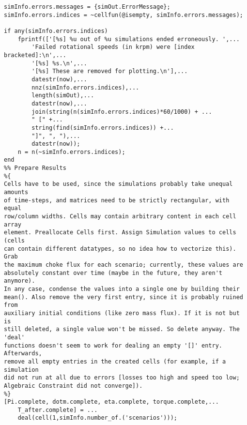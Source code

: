 \begin{lstlisting}
simInfo.errors.messages = {simOut.ErrorMessage};
simInfo.errors.indices = ~cellfun(@isempty, simInfo.errors.messages);

if any(simInfo.errors.indices)
    fprintf(['[%s] %u out of %u simulations ended erroneously. ',...
        'Failed rotational speeds (in krpm) were [index bracketed]:\n',...
        '[%s] %s.\n',...
        '[%s] These are removed for plotting.\n'],...
        datestr(now),...
        nnz(simInfo.errors.indices),...
        length(simOut),...
        datestr(now),...
        join(string(n(simInfo.errors.indices)*60/1000) + ...
        " [" +...
        string(find(simInfo.errors.indices)) +...
        "]", ", "),...
        datestr(now));
    n = n(~simInfo.errors.indices);
end
%% Prepare Results
%{
Cells have to be used, since the simulations probably take unequal amounts
of time-steps, and matrices need to be strictly rectangular, with equal
row/column widths. Cells may contain arbitrary content in each cell array
element. Preallocate Cells first. Assign Simulation values to cells (cells
can contain different datatypes, so no idea how to vectorize this). Grab
the maximum choke flux for each scenario; currently, these values are
absolutely constant over time (maybe in the future, they aren't anymore).
In any case, condense the values into a single one by building their
mean(). Also remove the very first entry, since it is probably ruined from
auxiliary initial conditions (like zero mass flux). If it is not but is
still deleted, a single value won't be missed. So delete anyway. The 'deal'
functions doesn't seem to work for dealing an empty '[]' entry. Afterwards,
remove all empty entries in the created cells (for example, if a simulation
did not run at all due to errors [losses too high and speed too low;
Algebraic Constraint did not converge]).
%}
[Pi.complete, dotm.complete, eta.complete, torque.complete,...
    T_after.complete] = ...
    deal(cell(1,simInfo.number_of.('scenarios')));


\end{lstlisting}
